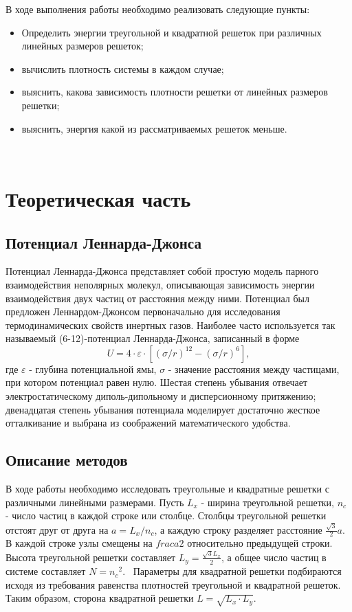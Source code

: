 \documentclass[14pt,a4paper,report]{ncc}
\begin{document}
В ходе выполнения работы необходимо реализовать следующие пункты:
\begin{itemize}
\item Определить энергии треугольной и квадратной решеток при различных линейных размеров решеток;
\item вычислить плотность системы в каждом случае;
\item выяснить, какова зависимость плотности решетки от линейных размеров решетки;
\item выяснить, энергия какой из рассматриваемых решеток меньше.
\end{itemize}

\

\newpage\section{Теоретическая часть }
\subsection{Потенциал Леннарда-Джонса}
Потенциал Леннарда-Джонса представляет собой простую модель парного взаимодействия неполярных молекул, описывающая зависимость энергии взаимодействия двух частиц от расстояния между ними.
Потенциал был предложен Леннардом-Джонсом первоначально для исследования термодинамических свойств инертных газов. Наиболее часто используется так называемый (6-12)-потенциал Леннарда-Джонса, записанный в форме 
\
\begin{equation}
 U = 4 \cdot \varepsilon \cdot [(\sigma/r)^{12} - (\sigma/r)^{6}  ] ,
 \end{equation} 
где $\varepsilon$ - глубина потенциальной ямы, $\sigma$ - значение расстояния между частицами, при котором потенциал равен нулю. Шестая степень убывания отвечает электростатическому диполь-дипольному и дисперсионному притяжению; двенадцатая степень убывания потенциала моделирует достаточно жесткое отталкивание и выбрана из соображений математического удобства.
\



\newpage
\subsection{Описание  методов}
В ходе работы необходимо исследовать треугольные и квадратные решетки с различными линейными размерами. Пусть $L_x$ - ширина треугольной решетки, $n_c$ - число частиц в каждой строке или столбце. Столбцы треугольной решетки отстоят друг от друга на $a={L_x}/{n_c}$, а каждую строку разделяет расстояние $\frac{\sqrt{3}}{2} a$. В каждой строке узлы смещены на $frac{a}{2}$ относительно предыдущей строки. Высота треугольной решетки составляет $L_y=\frac{\sqrt{3}L_x}{2}$, а общее число частиц в системе составляет $N={n_c}^2$. 
\
Параметры для квадратной решетки подбираются исходя из требования равенства плотностей  треугольной и квадратной решеток. Таким образом, сторона квадратной решетки $L=\sqrt{L_x \cdot L_y}$.
\
\end{document}
